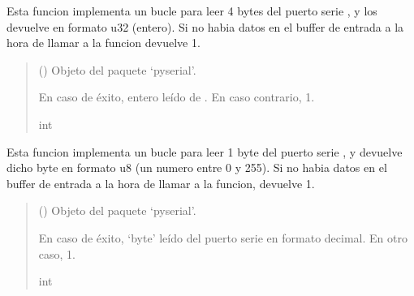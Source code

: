 \documentclass[letterpaper,10pt,english]{sphinxmanual}
\begin{document}
\begin{fulllineitems}
\label{\detokenize{fpga.interfaz_pcps:fpga.interfaz_pcps.receive_u32}}
\pysigstartsignatures
{}
\pysigstopsignatures
\sphinxAtStartPar
Esta funcion implementa un bucle para leer 4 bytes del puerto serie , y los devuelve en formato u32 (entero). Si no habia datos en el buffer de entrada a la hora de llamar a la funcion devuelve \sphinxhyphen{}1.
\begin{quote}\begin{description}
\sphinxAtStartPar
{} () \textendash{} Objeto  del paquete ‘pyserial’.

\sphinxAtStartPar
En caso de éxito, entero leído de . En caso contrario, \sphinxhyphen{}1.

\sphinxAtStartPar
int

\end{description}\end{quote}

\end{fulllineitems}


\begin{fulllineitems}
\label{\detokenize{fpga.interfaz_pcps:fpga.interfaz_pcps.receive_u8}}
\pysigstartsignatures
{}
\pysigstopsignatures
\sphinxAtStartPar
Esta funcion implementa un bucle para leer 1 byte del puerto serie , y devuelve dicho byte en formato u8 (un numero entre 0 y 255). Si no habia datos en el buffer de entrada a la hora de llamar a la funcion, devuelve \sphinxhyphen{}1.
\begin{quote}\begin{description}
\sphinxAtStartPar
{} () \textendash{} Objeto  del paquete ‘pyserial’.

\sphinxAtStartPar
En caso de éxito, ‘byte’ leído del puerto serie en formato decimal. En otro caso, \sphinxhyphen{}1.

\sphinxAtStartPar
int

\end{description}\end{quote}

\end{fulllineitems}
\end{document}
